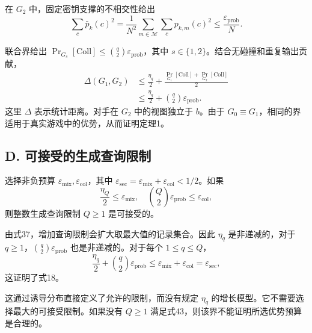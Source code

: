 \documentclass[UTF8,a4paper,zihao=-4,fontset=windows,openany]{ctexbook}
\begin{document}
在 \(G_2\) 中，固定密钥支撑的不相交性给出
\begin{equation}
\sum_c \bar{p}_k(c)^2 = \frac{1}{N^2} \sum_{m \in \mathcal{M}} \sum_c p_{k,m}(c)^2 \le \frac{\varepsilon_{\mathrm{prob}}}{N}. \tag{41}
\end{equation}

联合界给出 \(\Pr_{G_s}[\mathrm{Coll}] \le \binom{q}{2} \varepsilon_{\mathrm{prob}}\)，其中 \(s \in \{1,2\}\)。结合无碰撞和重复输出贡献，
\begin{equation}
\begin{aligned}
\Delta(G_1, G_2) &\le \frac{\eta_q}{2} + \frac{\Pr_{G_1}[\mathrm{Coll}] + \Pr_{G_2}[\mathrm{Coll}]}{2} \\
&\le \frac{\eta_q}{2} + \binom{q}{2} \varepsilon_{\mathrm{prob}}.
\end{aligned} \tag{42}
\end{equation}
这里 \(\Delta\) 表示统计距离。对手在 \(G_2\) 中的视图独立于 \(b\)。由于 \(G_0 \equiv G_1\)，相同的界适用于真实游戏中的优势，从而证明定理1。

\subsection*{D. 可接受的生成查询限制}

选择非负预算 \(\varepsilon_{\mathrm{mix}}, \varepsilon_{\mathrm{col}}\)，其中 \(\varepsilon_{\mathrm{sec}} = \varepsilon_{\mathrm{mix}} + \varepsilon_{\mathrm{col}} < 1/2\)。如果
\begin{equation}
\frac{\eta_Q}{2} \le \varepsilon_{\mathrm{mix}}, \quad \binom{Q}{2} \varepsilon_{\mathrm{prob}} \le \varepsilon_{\mathrm{col}}, \tag{43}
\end{equation}
则整数生成查询限制 \(Q \ge 1\) 是可接受的。

由式37，增加查询限制会扩大取最大值的记录集合。因此 \(\eta_q\) 是非递减的，对于 \(q \ge 1\)，\(\binom{q}{2} \varepsilon_{\mathrm{prob}}\) 也是非递减的。对于每个 \(1 \le q \le Q\)，
\begin{equation}
\frac{\eta_q}{2} + \binom{q}{2} \varepsilon_{\mathrm{prob}} \le \varepsilon_{\mathrm{mix}} + \varepsilon_{\mathrm{col}} = \varepsilon_{\mathrm{sec}}, \tag{44}
\end{equation}
这证明了式18。

这通过诱导分布直接定义了允许的限制，而没有规定 \(\eta_q\) 的增长模型。它不需要选择最大的可接受限制。如果没有 \(Q \ge 1\) 满足式43，则该界不能证明所选优势预算是合理的。

\end{document}
